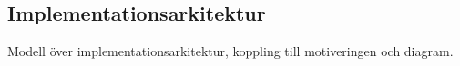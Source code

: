\subsection{Implementationsarkitektur}
Modell över implementationsarkitektur, koppling till motiveringen och diagram.